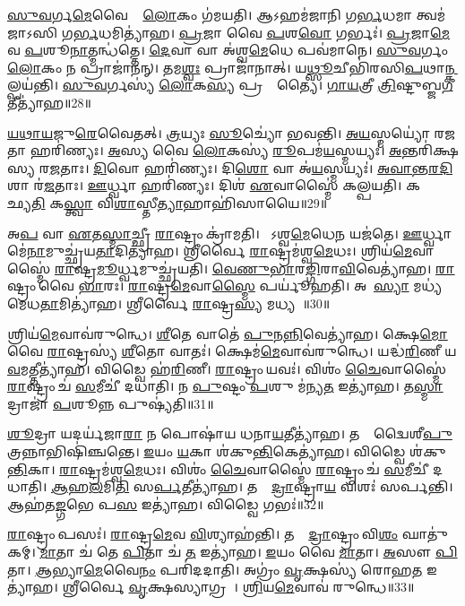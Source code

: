 \ul{𑌸𑍁}\ul{𑌵}𑌰𑍍𑌗\ul{𑌮𑍇}𑌵𑍈𑌨𑌾𑌂᳚ \ul{𑌲𑍋}𑌕𑌂 𑌗॑𑌮𑌯𑌤𑌿।
𑌆𑌽𑌹𑌮॑𑌜𑌾𑌨𑌿 𑌗\ul{𑌰𑍍𑌭}𑌧𑌮𑌾 𑌤𑍍𑌵𑌮॑𑌜𑌾𑌽𑌸𑌿 𑌗\ul{𑌰𑍍𑌭}𑌧𑌮𑌿𑌤𑍍𑌯𑌾॑𑌹।
\ul{𑌪𑍍𑌰}𑌜𑌾 𑌵𑍈 \ul{𑌪}𑌶\ul{𑌵𑍋} 𑌗𑌰𑍍𑌭𑌃॑।
\ul{𑌪𑍍𑌰}𑌜𑌾\ul{𑌮𑍇}𑌵 \ul{𑌪}𑌶𑍂\ul{𑌨𑌾}𑌤𑍍𑌮𑌨𑍍𑌧॑𑌤𑍍𑌤𑍇।
\ul{𑌦𑍇}𑌵𑌾 𑌵𑌾 𑌅॑𑌶𑍍𑌵\ul{𑌮𑍇}𑌧𑍇 𑌪𑌵॑𑌮𑌾𑌨𑍇।
\ul{𑌸𑍁}\ul{𑌵}𑌰𑍍𑌗𑌂 \ul{𑌲𑍋}𑌕𑌂 𑌨 𑌪𑍍𑌰𑌾𑌜𑌾॑𑌨𑌨𑍍।
𑌤𑌮\ul{𑌶𑍍𑌵𑌃} 𑌪𑍍𑌰𑌾𑌜𑌾॑𑌨𑌾𑌤𑍍।
𑌯\ul{𑌥𑍍𑌸𑍂}𑌚𑍀𑌭𑌿॑𑌰𑌸𑌿\ul{𑌪}𑌥𑌾\ul{𑌨𑍍𑌕}𑌲𑍍𑌪𑌯॑𑌨𑍍𑌤𑌿।
\ul{𑌸𑍁}\ul{𑌵}𑌰𑍍𑌗𑌸𑍍𑌯॑ \ul{𑌲𑍋}𑌕\ul{𑌸𑍍𑌯} 𑌪𑍍𑌰𑌜𑍍𑌞𑌾᳚𑌤𑍍𑌯𑍈।
\ul{𑌗𑌾}\ul{𑌯}𑌤𑍍𑌰𑍀 \ul{𑌤𑍍𑌰𑌿}𑌷𑍍𑌟𑍁𑌬𑍍𑌜\ul{𑌗}𑌤𑍀𑌤𑍍𑌯𑌾॑𑌹॥28॥

\ul{𑌯}\ul{𑌥𑌾}\ul{𑌯}𑌜𑍁\ul{𑌰𑍇}𑌵𑍈𑌤𑌤𑍍।
\ul{𑌤𑍍𑌰}𑌯𑍍𑌯𑌃 \ul{𑌸𑍂}𑌚𑍍𑌯𑍋॑ 𑌭𑌵𑌨𑍍𑌤𑌿।
\ul{𑌅}\ul{𑌯}𑌸𑍍𑌮𑌯𑍍𑌯𑍋॑ 𑌰\ul{𑌜}𑌤𑌾 𑌹𑌰𑌿॑𑌣𑍍𑌯𑌃।
\ul{𑌅}𑌸𑍍𑌯 𑌵𑍈 \ul{𑌲𑍋}𑌕𑌸𑍍𑌯॑ \ul{𑌰𑍂}𑌪𑌮॑\ul{𑌯}𑌸𑍍𑌮𑌯𑍍𑌯𑌃॑।
\ul{𑌅}𑌨𑍍𑌤𑌰𑌿॑𑌕𑍍𑌷𑌸𑍍𑌯 𑌰\ul{𑌜}𑌤𑌾𑌃।
\ul{𑌦𑌿}𑌵𑍋 𑌹𑌰𑌿॑𑌣𑍍𑌯𑌃।
𑌦𑌿\ul{𑌶𑍋} 𑌵𑌾 𑌅॑\ul{𑌯}𑌸𑍍𑌮𑌯𑍍𑌯𑌃॑।
\ul{𑌅}\ul{𑌵𑌾}\ul{𑌨𑍍𑌤}\ul{𑌰}\ul{𑌦𑌿}𑌶𑌾 𑌰॑\ul{𑌜}𑌤𑌾𑌃।
\ul{𑌊}𑌰𑍍𑌧𑍍𑌵𑌾 𑌹𑌰𑌿॑𑌣𑍍𑌯𑌃।
𑌦𑌿𑌶॑ \ul{𑌏}𑌵𑌾𑌸𑍍𑌮𑍈॑ 𑌕𑌲𑍍𑌪𑌯𑌤𑌿।
𑌕𑌸𑍍𑌤𑍍𑌵𑌾᳚ 𑌛𑍍𑌯\ul{𑌤𑌿} 𑌕\ul{𑌸𑍍𑌤𑍍𑌵𑌾} 𑌵𑌿\ul{𑌶𑌾}𑌸𑍍𑌤𑍀\ul{𑌤𑍍𑌯𑌾}𑌹𑌾𑌹𑌿॑𑌸𑌾𑌯𑍈॥29॥\anuvakamend[\ul{𑌹𑍍𑌨𑍁}\ul{𑌵}\ul{𑌤𑍇} \ul{𑌕𑍍𑌰𑌾}\ul{𑌮}\ul{𑌨𑍍𑌤𑍍𑌯𑍂}\ul{𑌰𑍍𑌣𑍍𑌵𑌾}\ul{𑌥𑌾}𑌮𑌿𑌤𑍍𑌯𑌾॑\ul{𑌹} 𑌜\ul{𑌗}𑌤𑍀𑌤𑍍𑌯𑌾॑𑌹 𑌕𑌲𑍍𑌪\ul{𑌯}𑌤𑍍𑌯𑍇𑌕𑌂॑ 𑌚]

𑌅\ul{𑌪} 𑌵𑌾 \ul{𑌏}𑌤\ul{𑌸𑍍𑌮𑌾}𑌚𑍍𑌛𑍍𑌰𑍀 \ul{𑌰𑌾}𑌷𑍍𑌟𑍍𑌰𑌂 𑌕𑍍𑌰𑌾॑𑌮𑌤𑌿।
𑌯𑍋᳚𑌽𑌶𑍍𑌵\ul{𑌮𑍇}𑌧𑍇\ul{𑌨} 𑌯𑌜॑𑌤𑍇।
\ul{𑌊}𑌰𑍍𑌧𑍍𑌵𑌾𑌮𑍇॑\ul{𑌨𑌾}𑌮𑍁𑌚𑍍𑌛𑍍𑌰॑𑌯\ul{𑌤𑌾}𑌦𑌿𑌤𑍍𑌯𑌾॑𑌹।
𑌶𑍍𑌰𑍀𑌰𑍍𑌵𑍈 \ul{𑌰𑌾}𑌷𑍍𑌟𑍍𑌰𑌮॑𑌶𑍍𑌵\ul{𑌮𑍇}𑌧𑌃।
𑌶𑍍𑌰𑌿𑌯॑\ul{𑌮𑍇}𑌵𑌾𑌸𑍍𑌮𑍈॑ \ul{𑌰𑌾}𑌷𑍍𑌟𑍍𑌰\ul{𑌮𑍂}𑌰𑍍𑌧𑍍𑌵𑌮𑍁𑌚𑍍𑌛𑍍𑌰॑𑌯𑌤𑌿।
\ul{𑌵𑍇}\ul{𑌣𑍁}\ul{𑌭𑌾}𑌰\ul{𑌙𑍍𑌗𑌿}𑌰𑌾\ul{𑌵𑌿}𑌵𑍇𑌤𑍍𑌯𑌾॑𑌹।
\ul{𑌰𑌾}𑌷𑍍𑌟𑍍𑌰𑌂 𑌵𑍈 \ul{𑌭𑌾}𑌰𑌃।
\ul{𑌰𑌾}𑌷𑍍𑌟𑍍𑌰\ul{𑌮𑍇}𑌵𑌾\ul{𑌸𑍍𑌮𑍈} 𑌪𑌰𑍍𑌯𑍂॑𑌹𑌤𑌿।
𑌅𑌥𑌾᳚\ul{𑌸𑍍𑌯𑌾} 𑌮𑌧𑍍𑌯॑𑌮𑍇𑌧\ul{𑌤𑌾}𑌮𑌿𑌤𑍍𑌯𑌾॑𑌹।
𑌶𑍍𑌰𑍀𑌰𑍍𑌵𑍈 \ul{𑌰𑌾}𑌷𑍍𑌟𑍍𑌰\ul{𑌸𑍍𑌯} 𑌮𑌧𑍍𑌯𑌮𑍍᳚॥30॥

𑌶𑍍𑌰𑌿𑌯॑\ul{𑌮𑍇}𑌵𑌾𑌵॑𑌰𑍁𑌨𑍍𑌧𑍇।
\ul{𑌶𑍀}𑌤𑍇 𑌵𑌾𑌤𑍇॑ \ul{𑌪𑍁}𑌨\ul{𑌨𑍍𑌨𑌿}𑌵𑍇𑌤𑍍𑌯𑌾॑𑌹।
𑌕𑍍𑌷𑍇\ul{𑌮𑍋} 𑌵𑍈 \ul{𑌰𑌾}𑌷𑍍𑌟𑍍𑌰𑌸𑍍𑌯॑ \ul{𑌶𑍀}𑌤𑍋 𑌵𑌾𑌤𑌃॑।
𑌕𑍍𑌷𑍇𑌮॑\ul{𑌮𑍇}𑌵𑌾𑌵॑𑌰𑍁𑌨𑍍𑌧𑍇।
𑌯𑌦𑍍𑌧॑\ul{𑌰𑌿}𑌣𑍀 𑌯\ul{𑌵}𑌮𑌤𑍍𑌤𑍀𑌤𑍍𑌯𑌾॑𑌹।
𑌵𑌿𑌡𑍍𑌵𑍈 𑌹॑\ul{𑌰𑌿}𑌣𑍀।
\ul{𑌰𑌾}𑌷𑍍𑌟𑍍𑌰𑌂 𑌯𑌵𑌃॑।
𑌵𑌿𑌶𑌂॑ \ul{𑌚𑍈}𑌵𑌾𑌸𑍍𑌮𑍈॑ \ul{𑌰𑌾}𑌷𑍍𑌟𑍍𑌰𑌂 𑌚॑ \ul{𑌸}𑌮𑍀𑌚𑍀॑ 𑌦𑌧𑌾𑌤𑌿।
𑌨 \ul{𑌪𑍁}𑌷𑍍𑌟𑌂 \ul{𑌪}𑌶𑍁 𑌮॑𑌨𑍍𑌯\ul{𑌤} 𑌇𑌤𑍍𑌯𑌾॑𑌹।
𑌤\ul{𑌸𑍍𑌮𑌾}𑌦𑍍𑌰𑌾𑌜𑌾॑ \ul{𑌪}𑌶𑍂𑌨𑍍𑌨 𑌪𑍁𑌷𑍍𑌯॑𑌤𑌿॥31॥

\ul{𑌶𑍂}𑌦𑍍𑌰𑌾 𑌯𑌦𑌰𑍍𑌯॑𑌜𑌾\ul{𑌰𑌾} 𑌨 𑌪𑍋𑌷𑌾॑𑌯 𑌧𑌨𑌾\ul{𑌯}𑌤𑍀𑌤𑍍𑌯𑌾॑𑌹।
𑌤𑌸𑍍𑌮𑌾᳚𑌦𑍍𑌵𑍈𑌶𑍀\ul{𑌪𑍁}𑌤𑍍𑌰𑌨𑍍𑌨𑌾𑌭𑌿𑌷𑌿॑𑌞𑍍𑌚𑌨𑍍𑌤𑍇।
\ul{𑌇}𑌯𑌂 \ul{𑌯}𑌕𑌾 𑌶॑𑌕𑍁\ul{𑌨𑍍𑌤𑌿}𑌕𑍇𑌤𑍍𑌯𑌾॑𑌹।
𑌵𑌿𑌡𑍍𑌵𑍈 𑌶॑𑌕𑍁\ul{𑌨𑍍𑌤𑌿}𑌕𑌾।
\ul{𑌰𑌾}𑌷𑍍𑌟𑍍𑌰𑌮॑𑌶𑍍𑌵\ul{𑌮𑍇}𑌧𑌃।
𑌵𑌿𑌶𑌂॑ \ul{𑌚𑍈}𑌵𑌾𑌸𑍍𑌮𑍈॑ \ul{𑌰𑌾}𑌷𑍍𑌟𑍍𑌰𑌂 𑌚॑ \ul{𑌸}𑌮𑍀𑌚𑍀॑ 𑌦𑌧𑌾𑌤𑌿।
\ul{𑌆}𑌹\ul{𑌲}𑌮𑌿\ul{𑌤𑌿} 𑌸\ul{𑌰𑍍𑌪}𑌤𑍀𑌤𑍍𑌯𑌾॑𑌹।
𑌤𑌸𑍍𑌮𑌾᳚\ul{𑌦𑍍𑌰𑌾}𑌷𑍍𑌟𑍍𑌰𑌾\ul{𑌯} 𑌵𑌿𑌶𑌃॑ 𑌸𑌰𑍍𑌪𑌨𑍍𑌤𑌿।
𑌆𑌹॑𑌤\ul{𑌙𑍍𑌗}𑌭𑍇 𑌪\ul{𑌸} 𑌇𑌤𑍍𑌯𑌾॑𑌹।
𑌵𑌿𑌡𑍍𑌵𑍈 𑌗𑌭𑌃॑॥32॥

\ul{𑌰𑌾}𑌷𑍍𑌟𑍍𑌰𑌂 𑌪𑌸𑌃॑।
\ul{𑌰𑌾}𑌷𑍍𑌟𑍍𑌰\ul{𑌮𑍇}𑌵 \ul{𑌵𑌿}𑌶𑍍𑌯𑌾𑌹॑𑌨𑍍𑌤𑌿।
𑌤𑌸𑍍𑌮𑌾᳚\ul{𑌦𑍍𑌰𑌾}𑌷𑍍𑌟𑍍𑌰𑌂 𑌵𑌿\ul{𑌶𑌂} 𑌘𑌾𑌤𑍁॑𑌕𑌮𑍍।
\ul{𑌮𑌾}𑌤𑌾 𑌚॑ 𑌤𑍇 \ul{𑌪𑌿}𑌤𑌾 𑌚॑ \ul{𑌤} 𑌇𑌤𑍍𑌯𑌾॑𑌹।
\ul{𑌇}𑌯𑌂 𑌵𑍈 \ul{𑌮𑌾}𑌤𑌾।
\ul{𑌅}𑌸𑍗 \ul{𑌪𑌿}𑌤𑌾।
\ul{𑌆}𑌭𑍍𑌯𑌾\ul{𑌮𑍇}𑌵𑍈\ul{𑌨𑌂} 𑌪𑌰𑌿॑𑌦𑌦𑌾𑌤𑌿।
𑌅𑌗𑍍𑌰𑌂॑ \ul{𑌵𑍃}𑌕𑍍𑌷𑌸𑍍𑌯॑ 𑌰𑍋𑌹\ul{𑌤} 𑌇𑌤𑍍𑌯𑌾॑𑌹।
𑌶𑍍𑌰𑍀𑌰𑍍𑌵𑍈 \ul{𑌵𑍃}𑌕𑍍𑌷𑌸𑍍𑌯𑌾𑌗𑍍𑌰𑌮𑍍᳚।
\ul{𑌶𑍍𑌰𑌿}𑌯\ul{𑌮𑍇}𑌵𑌾𑌵॑ 𑌰𑍁𑌨𑍍𑌧𑍇॥33॥

